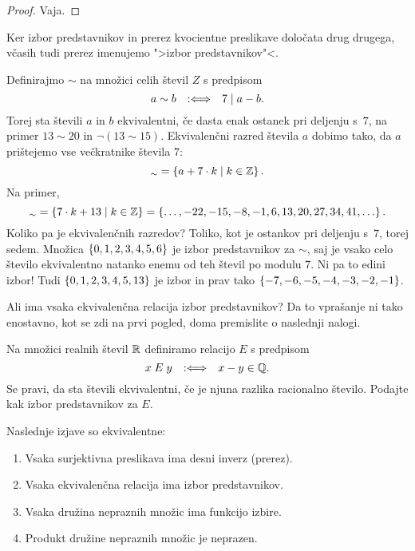 \begin{proof}
  Vaja.
\end{proof}

Ker izbor predstavnikov in prerez kvocientne preslikave določata drug drugega, včasih tudi
prerez imenujemo ">izbor predstavnikov"<.

\begin{zgled}
  Definirajmo $\sim$ na množici celih števil $Z$ s predpisom
  \begin{equation*}
    a \sim b \quad {{:}{\Longleftrightarrow}}\quad 7 \mathrel{|} a - b.
  \end{equation*}
  Torej sta števili $a$ in $b$ ekvivalentni, če dasta enak ostanek pri deljenju s~$7$,
  na primer $13 \sim 20$ in $\lnot (13 \sim 15)$.
  Ekvivalenčni razred števila $a$ dobimo tako, da $a$ prištejemo vse večkratnike števila $7$:
  \begin{equation*}
    [a]_{\sim} = \set{ a + 7 \cdot k \such k \in \ZZ }.
  \end{equation*}
  Na primer,
  \begin{equation*}
    [13]_\sim = \set{ 7 \cdot k + 13 \such k \in \ZZ }
           = \set{ \ldots, -22, -15, -8, -1, 6, 13, 20, 27, 34, 41, \ldots}.
  \end{equation*}
  Koliko pa je ekvivalenčnih razredov? Toliko, kot je ostankov pri deljenju s~$7$, torej sedem. Množica
  $\left\{0, 1, 2, 3, 4, 5, 6\right\}$ je izbor predstavnikov za $\sim$, saj je vsako celo število ekvivalentno natanko enemu od
  teh števil po modulu $7$.
  Ni pa to edini izbor! Tudi $\left\{0, 1, 2, 3, 4, 5, 13\right\}$ je izbor in prav tako $\left\{-7, -6, -5, -4, -3, -2, -1\right\}$.
\end{zgled}

Ali ima vsaka ekvivalenčna relacija izbor predstavnikov? Da to vprašanje ni tako
enostavno, kot se zdi na prvi pogled, doma premislite o naslednji nalogi.

\begin{vaja}
  Na množici realnih števil $\mathbb{R}$ definiramo relacijo $E$ s predpisom
  \begin{equation*}
    x \mathrel{E} y  \quad {{:}{\Longleftrightarrow}}\quad  x - y \in \mathbb{Q}.
  \end{equation*}
  Se pravi, da sta števili ekvivalentni, če je njuna razlika racionalno število. Podajte kak
  izbor predstavnikov za $E$.
\end{vaja}

\begin{izrek}
  Naslednje izjave so ekvivalentne:
  \begin{enumerate}
  \item Vsaka surjektivna preslikava ima desni inverz (prerez).
  \item Vsaka ekvivalenčna relacija ima izbor predstavnikov.
  \item Vsaka družina nepraznih množic ima funkcijo izbire.
  \item Produkt družine nepraznih množic je neprazen.
  \end{enumerate}
\end{izrek}

